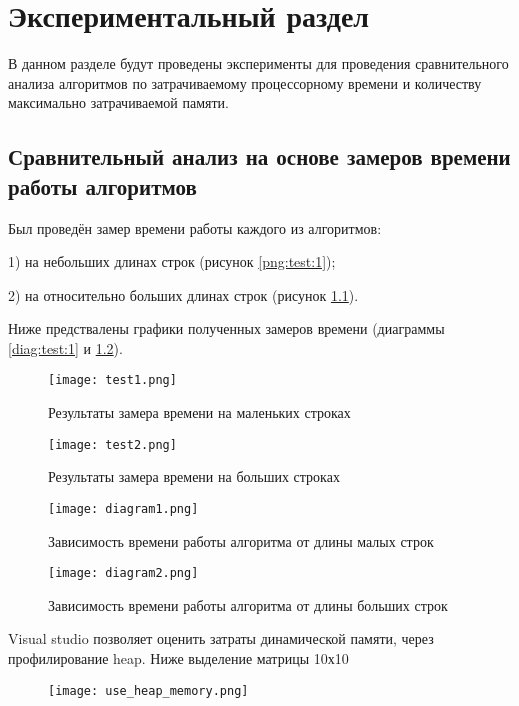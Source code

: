 \chapter{Экспериментальный раздел}
\label{cha:research}
    В данном разделе будут проведены эксперименты для проведения 
    сравнительного анализа алгоритмов по затрачиваемому процессорному 
    времени\cite{CPU-time} и количеству максимально затрачиваемой памяти.

    \section{Сравнительный анализ на основе замеров времени работы алгоритмов}
    
        Был проведён замер времени работы каждого из алгоритмов:
        
        1) на небольших длинах строк (рисунок \ref{png:test:1});
        
        2) на относительно больших длинах строк (рисунок \ref{png:test:2}).
        
        Ниже предствалены графики полученных замеров времени
        (диаграммы \ref{diag:test:1} и \ref{diag:test:2}).

        \begin{figure}[h!]
            \centering
            \texttt{[image: test1.png]}
            \caption{Результаты замера времени на маленьких строках}
            \label{png:test:1}

            \texttt{[image: test2.png]}
            \caption{Результаты замера времени на больших строках}
            \label{png:test:2}
        \end{figure}

        \begin{figure}[h!]
            \centering
            \texttt{[image: diagram1.png]}
            \caption{Зависимость времени работы алгоритма от длины малых строк}
            \label{diag:test:1}
            \texttt{[image: diagram2.png]}
            \caption{Зависимость времени работы алгоритма от длины больших строк}
            \label{diag:test:2}
        \end{figure}

        \vspace{1cm}

        Visual studio позволяет оценить затраты динамической памяти, через профилирование heap.
        Ниже выделение матрицы 10х10
        \begin{figure}[h!]
            \texttt{[image: use\_heap\_memory.png]}
        \end{figure}
\newpage